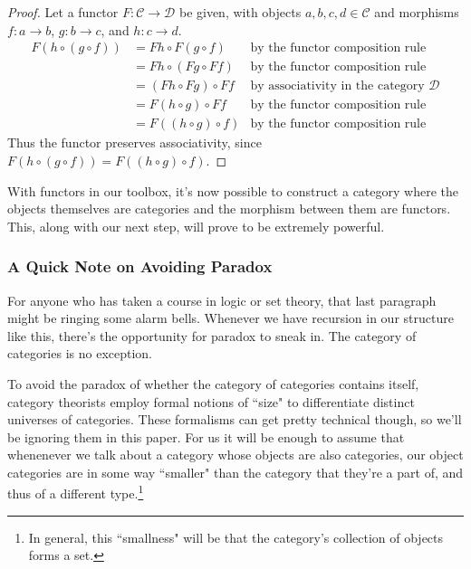 \documentclass[12pt]{article}
\theoremstyle{definition}
\begin{document}
\begin{proof}
    Let a functor $F:\mathcal{C} \rightarrow \mathcal{D}$ be given, with objects $a,b,c,d\in\mathcal{C}$ and morphisms $f:a \rightarrow b$, $g:b \rightarrow c$, and $h:c \rightarrow d$.
    \begin{align*}
        F(h \circ (g \circ f)) & = Fh \circ F(g \circ f)  & \text{by the functor composition rule}                \\
                               & = Fh \circ (Fg \circ Ff) & \text{by the functor composition rule}                \\
                               & = (Fh \circ Fg) \circ Ff & \text{by associativity in the category $\mathcal{D}$} \\
                               & = F(h \circ g) \circ Ff  & \text{by the functor composition rule}                \\
                               & = F((h \circ g) \circ f) & \text{by the functor composition rule}
    \end{align*}
    Thus the functor preserves associativity, since $F(h \circ (g \circ f)) = F((h \circ g) \circ f)$.
\end{proof}

With functors in our toolbox, it's now possible to construct a category where the objects themselves are categories and the morphism between them are functors.
This, along with our next step, will prove to be extremely powerful.

\subsubsection*{A Quick Note on Avoiding Paradox}
For anyone who has taken a course in logic or set theory, that last paragraph might be ringing some alarm bells.
Whenever we have recursion in our structure like this, there's the opportunity for paradox to sneak in.
The category of categories is no exception.

To avoid the paradox of whether the category of categories contains itself, category theorists employ formal notions of ``size" to differentiate distinct universes of categories.
These formalisms can get pretty technical though, so we'll be ignoring them in this paper.
For us it will be enough to assume that whenenever we talk about a category whose objects are also categories, our object categories are in some way ``smaller" than the category that they're a part of, and thus of a different type.\footnote{In general, this ``smallness" will be that the category's collection of objects forms a set.}
\end{document}
